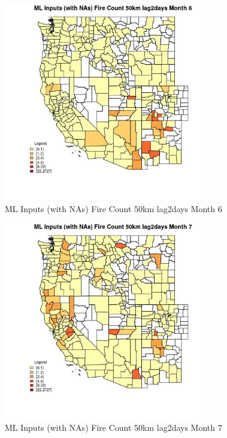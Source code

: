 \begin{figure} 
\centering  
\includegraphics[width=0.77\textwidth]{Code_Outputs/Report_ML_input_PM25_Step4_part_f_de_duplicated_aveswNAs_CountyFire_Count_50km_lag2daysmedianMonth6.jpg} 
\caption{\label{fig:Report_ML_input_PM25_Step4_part_f_de_duplicated_aveswNAsCountyFire_Count_50km_lag2daysmedianMonth6}ML Inputs (with NAs) Fire Count 50km lag2days Month 6} 
\end{figure} 
 

\begin{figure} 
\centering  
\includegraphics[width=0.77\textwidth]{Code_Outputs/Report_ML_input_PM25_Step4_part_f_de_duplicated_aveswNAs_CountyFire_Count_50km_lag2daysmedianMonth7.jpg} 
\caption{\label{fig:Report_ML_input_PM25_Step4_part_f_de_duplicated_aveswNAsCountyFire_Count_50km_lag2daysmedianMonth7}ML Inputs (with NAs) Fire Count 50km lag2days Month 7} 
\end{figure} 
 

